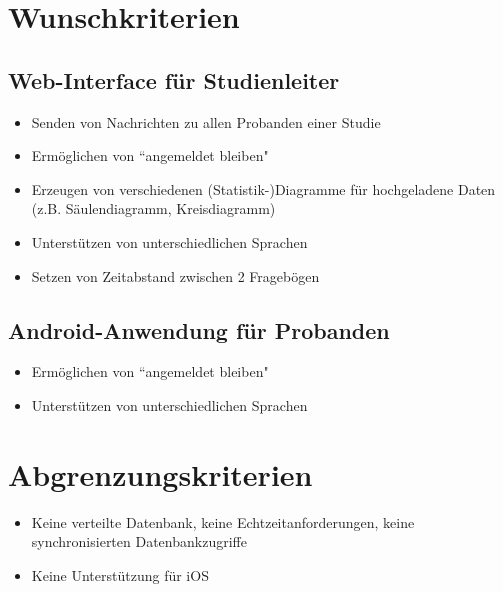 \documentclass[a4paper]{scrreprt}
\begin{document}
                \vspace*{0.5cm}


        \section{Wunschkriterien}

            \subsection{\gls{Web-Interface} f\"ur \gls{Studienleiter}}
                \begin{itemize}
                    \item Senden von Nachrichten zu allen \gls{Proband}en einer Studie
                    \item Erm\"oglichen von ``angemeldet bleiben"
                    \item Erzeugen von verschiedenen (Statistik-)Diagramme f\"ur hochgeladene Daten (z.B. S\"aulendiagramm, Kreisdiagramm)
                    \item Unterst\"utzen von unterschiedlichen Sprachen
                    \item Setzen von Zeitabstand zwischen 2 Frageb\"ogen

                \end{itemize}

            \subsection{Android-Anwendung f\"ur \gls{Proband}en}
                \begin{itemize}
                    \item Erm\"oglichen von ``angemeldet bleiben"
                    \item Unterst\"utzen von unterschiedlichen Sprachen
                \end{itemize}
                \vspace*{0.5cm}


        \section{Abgrenzungskriterien}
            \begin{itemize}
                \item Keine verteilte Datenbank, keine Echtzeitanforderungen, keine synchronisierten Datenbankzugriffe
                \item Keine Unterst\"utzung f\"ur iOS
            \end{itemize}
\end{document}
